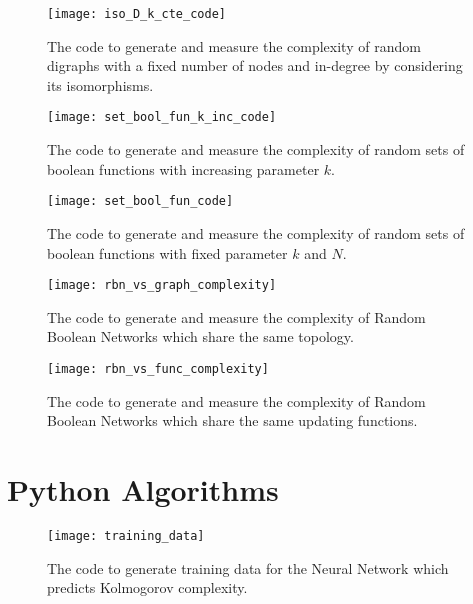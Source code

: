 \begin{figure}[h]
	\centering
		\texttt{[image: iso\_D\_k\_cte\_code]}
	\caption{The code to generate and measure the complexity of random digraphs with a fixed number of nodes and in-degree by considering its isomorphisms.}
	\label{fig:iso_D_k_cte_code}
\end{figure}

\begin{figure}[h]
	\centering
		\texttt{[image: set\_bool\_fun\_k\_inc\_code]}
	\caption{The code to generate and measure the complexity of random sets of boolean functions with increasing parameter $k$.}
	\label{fig:set_bool_fun_k_inc_code}
\end{figure}

\begin{figure}[h]
	\centering
		\texttt{[image: set\_bool\_fun\_code]}
	\caption{The code to generate and measure the complexity of random sets of boolean functions with fixed parameter $k$ and $N$.}
	\label{fig:set_bool_fun_code}
\end{figure}

\begin{figure}[h]
	\centering
		\texttt{[image: rbn\_vs\_graph\_complexity]}
	\caption{The code to generate and measure the complexity of Random Boolean Networks which share the same topology.}
	\label{fig:rbn_vs_graph_complexity}
\end{figure}

\begin{figure}[h]
	\centering
		\texttt{[image: rbn\_vs\_func\_complexity]}
	\caption{The code to generate and measure the complexity of Random Boolean Networks which share the same updating functions.}
	\label{fig:rbn_vs_func_complexity}
\end{figure}

\clearpage

\section{Python Algorithms}
\label{codes_python}

\begin{figure}[h]
	\centering
		\texttt{[image: training\_data]}
	\caption{The code to generate training data for the Neural Network which predicts Kolmogorov complexity.}
	\label{fig:training_data}
\end{figure}


